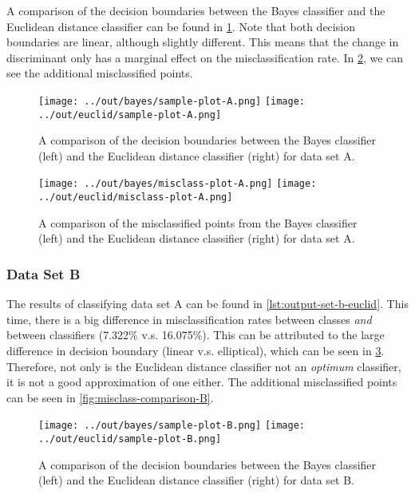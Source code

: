 \documentclass[headings=optiontoheadandtoc,listof=totoc,parskip=full]{scrartcl}
\begin{document}
A comparison of the decision boundaries between the Bayes classifier and the Euclidean distance classifier can be found in \cref{fig:sample-comparison-A}. Note that both decision boundaries are linear, although slightly different. This means that the change in discriminant only has a marginal effect on the misclassification rate. In \cref{fig:misclass-comparison-A}, we can see the additional misclassified points.

\begin{figure}[H]
	\centering
	\texttt{[image: ../out/bayes/sample-plot-A.png]}
	\texttt{[image: ../out/euclid/sample-plot-A.png]}
	\caption{A comparison of the decision boundaries between the Bayes classifier (left) and the Euclidean distance classifier (right) for data set A.}
	\label{fig:sample-comparison-A}
\end{figure}


\begin{figure}[H]
	\centering
	\texttt{[image: ../out/bayes/misclass-plot-A.png]}
	\texttt{[image: ../out/euclid/misclass-plot-A.png]}
	\caption{A comparison of the misclassified points from the Bayes classifier (left) and the Euclidean distance classifier (right) for data set A.}
	\label{fig:misclass-comparison-A}
\end{figure}

\subsubsection{Data Set B}

The results of classifying data set A can be found in \cref{lst:output-set-b-euclid}. This time, there is a big difference in misclassification rates between classes \emph{and} between classifiers (7.322\% v.s. 16.075\%). This can be attributed to the large difference in decision boundary (linear v.s. elliptical), which can be seen in \cref{fig:sample-comparison-B}. Therefore, not only is the Euclidean distance classifier not an \emph{optimum} classifier, it is not a good approximation of one either. The additional misclassified points can be seen in \cref{fig:misclass-comparison-B}.



\begin{figure}[H]
	\centering
	\texttt{[image: ../out/bayes/sample-plot-B.png]}
	\texttt{[image: ../out/euclid/sample-plot-B.png]}
	\caption{A comparison of the decision boundaries between the Bayes classifier (left) and the Euclidean distance classifier (right) for data set B.}
	\label{fig:sample-comparison-B}
\end{figure}
\end{document}
